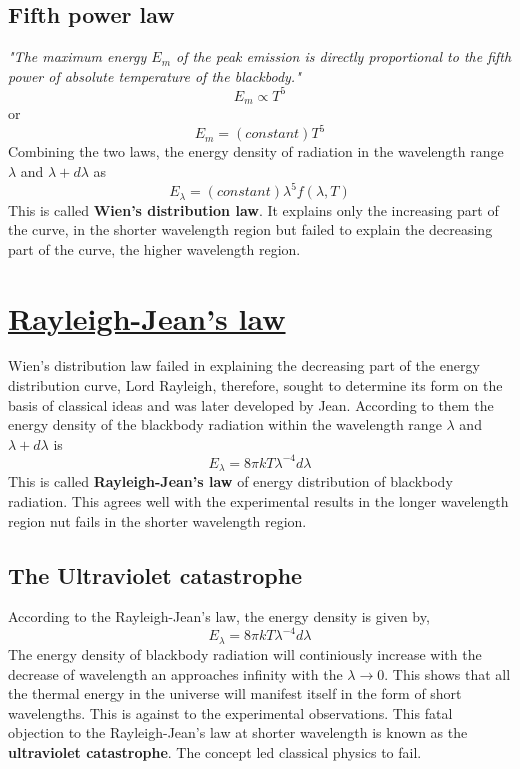 \documentclass[14pt,a4paper]{article}
\begin{document}
    \subsection{\textbf{Fifth power law}}  \textit{"The maximum energy $E_{m}$ of the peak emission is directly proportional to the fifth power of absolute temperature of the blackbody."}
    \begin{equation*}
        E_{m} \propto T^{5}
    \end{equation*}
    or
    \begin{equation}
        E_{m} = (constant)T^{5}
    \end{equation}
Combining the two laws, the energy density of radiation in the wavelength range $\lambda$ and $\lambda+d\lambda$ as
    \begin{equation}
        E_{\lambda} = (constant)\lambda^{5} f(\lambda,T) 
    \end{equation}
This is called \textbf{Wien's distribution law}. It explains only the increasing part of the curve, in the shorter wavelength region but failed to explain the decreasing part of the curve, the higher wavelength region.

\section{\underline{Rayleigh-Jean's law}} 
Wien's distribution law failed in explaining the decreasing part of the energy distribution curve, Lord Rayleigh, therefore, sought to determine its form on the basis of classical ideas and was later developed by Jean. According to them the energy  density of the blackbody radiation within the wavelength range $\lambda$ and $\lambda+d\lambda$ is 
\begin{equation}
    E_{\lambda} = 8\pi kT\lambda^{-4}d\lambda
\end{equation}
This is called \textbf{Rayleigh-Jean's law} of energy distribution of blackbody radiation. This agrees well with the experimental results in the longer wavelength region nut fails in the shorter wavelength region.
\subsection{The Ultraviolet catastrophe}
According to the Rayleigh-Jean's law, the energy density is given by,
\begin{equation*}
    E_{\lambda} = 8\pi kT\lambda^{-4}d\lambda
\end{equation*}
The energy density of blackbody radiation will continiously increase with the decrease of wavelength an approaches infinity with the $\lambda \rightarrow 0 $. This shows that all the thermal energy in the universe will manifest itself in the form of short wavelengths. This is against to the experimental observations. This fatal objection to the Rayleigh-Jean's law at shorter wavelength is known as the \textbf{ultraviolet catastrophe}. The concept led classical physics to fail.
\newpage
\end{document}
